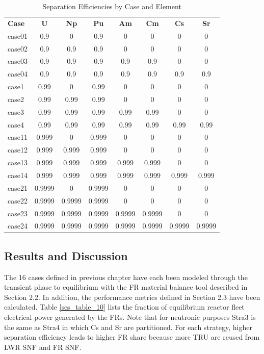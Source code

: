 \begin{table}[htbp]
\begin{center}
\caption{Separation Efficiencies by Case and Element}
\label{ses_table8}
\begin{tabular}{|l|c|c|c|c|c|c|c|}
\hline
\textbf{Case} & \textbf{U} & \textbf{Np} & \textbf{Pu} & \textbf{Am} & \textbf{Cm} & \textbf{Cs} & \textbf{Sr} \\
case01 & 0.9    & 0      & 0.9    & 0      & 0      & 0      & 0      \\
case02 & 0.9    & 0.9    & 0.9    & 0      & 0      & 0      & 0      \\
case03 & 0.9    & 0.9    & 0.9    & 0.9    & 0.9    & 0      & 0      \\
case04 & 0.9    & 0.9    & 0.9    & 0.9    & 0.9    & 0.9    & 0.9    \\
case1  & 0.99   & 0      & 0.99   & 0      & 0      & 0      & 0      \\
case2  & 0.99   & 0.99   & 0.99   & 0      & 0      & 0      & 0      \\
case3  & 0.99   & 0.99   & 0.99   & 0.99   & 0.99   & 0      & 0      \\
case4  & 0.99   & 0.99   & 0.99   & 0.99   & 0.99   &0.99    & 0.99   \\
case11 & 0.999  & 0      & 0.999  & 0      & 0      & 0      & 0      \\
case12 & 0.999  & 0.999  & 0.999  & 0      & 0      & 0      & 0      \\
case13 & 0.999  & 0.999  & 0.999  & 0.999  & 0.999  & 0      & 0      \\
case14 & 0.999  & 0.999  & 0.999  & 0.999  & 0.999  & 0.999  & 0.999  \\
case21 & 0.9999 & 0      & 0.9999 & 0      & 0      & 0      & 0      \\
case22 & 0.9999 & 0.9999 & 0.9999 & 0      & 0      & 0      & 0      \\
case23 & 0.9999 & 0.9999 & 0.9999 & 0.9999 & 0.9999 & 0      & 0      \\
case24 & 0.9999 & 0.9999 & 0.9999 & 0.9999 & 0.9999 & 0.9999 & 0.9999 \\
\hline
\end{tabular}
\end{center}
\end{table}



\subsection{Results and Discussion}
\label{ses_sec:res_disc}
The 16 cases defined in previous chapter have each been modeled through
the transient phase to equilibrium with the FR material balance tool
described in Section 2.2.  In addition, the performance metrics defined
in Section 2.3 have been calculated.  Table \ref{ses_table_10} lists the fraction of
equilibrium reactor fleet electrical power generated by the FRs.  Note
that for neutronic purposes Stra3 is the same as Stra4 in which Cs and
Sr are partitioned.  For each strategy, higher separation efficiency
leads to higher FR share because more TRU are reused from LWR SNF and FR
SNF.  

